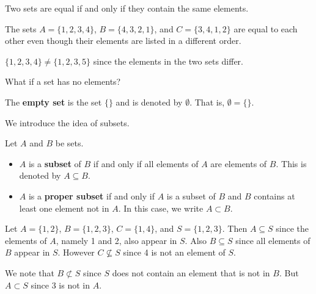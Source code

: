 \begin{definition}
    Two sets are equal if and only if they contain the same elements.
\end{definition}
\begin{example}
    The sets $A = \{1, 2, 3, 4\}$, $B = \{4, 3, 2, 1\}$, and $C = \{3, 4, 1, 2\}$ are equal to each other even though their elements are listed in a different order.
\end{example}
\begin{example}
    $\{1, 2, 3, 4\} \neq \{1, 2, 3, 5\}$ since the elements in the two sets differ.
\end{example}

What if a set has no elements?
\begin{definition}
    The \textbf{empty set} is the set $\{\}$ and is denoted by $\emptyset$. That is, $\emptyset = \{\}$.
\end{definition}

\newpage

We introduce the idea of subsets.
\begin{definition}
    Let $A$ and $B$ be sets.
    \begin{itemize}
        \item $A$ is a \textbf{subset} of $B$ if and only if all elements of $A$ are elements of $B$. This is denoted by $A \subseteq B$.
        \item $A$ is a \textbf{proper subset} if and only if $A$ is a subset of $B$ and $B$ contains at least one element not in $A$. In this case, we write $A \subset B$.
    \end{itemize}
\end{definition}

\begin{example}
    Let $A = \{1, 2\}$, $B = \{1, 2, 3\}$, $C = \{1, 4\}$, and $S = \{1, 2, 3\}$. Then $A \subseteq S$ since the elements of $A$, namely 1 and 2, also appear in $S$. Also $B \subseteq S$ since all elements of $B$ appear in $S$. However $C \not\subseteq S$ since 4 is not an element of $S$.

    We note that $B \not\subset S$ since $S$ does not contain an element that is not in $B$. But $A \subset S$ since 3 is not in $A$.
\end{example}

